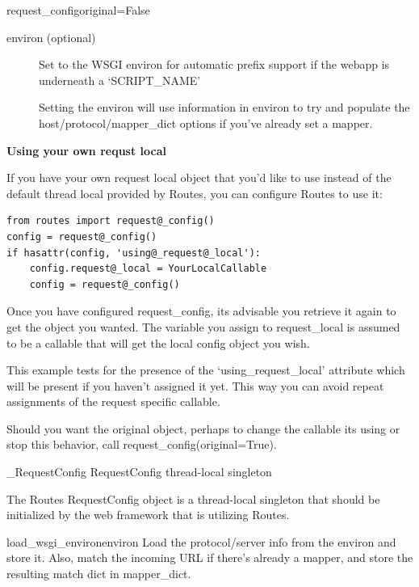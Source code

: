 \documentclass[letterpaper,10pt,english]{manual}
\begin{document}
\begin{funcdesc}{request\_config}{original=False}
\begin{description}
\item[environ (optional)] \leavevmode
Set to the WSGI environ for automatic prefix support if the
webapp is underneath a `SCRIPT\_NAME'

Setting the environ will use information in environ to try and
populate the host/protocol/mapper\_dict options if you've already
set a mapper.

\end{description}

\textbf{Using your own requst local}

If you have your own request local object that you'd like to use instead 
of the default thread local provided by Routes, you can configure Routes 
to use it:

\begin{Verbatim}[commandchars=@\[\]]
from routes import request@_config()
config = request@_config()
if hasattr(config, 'using@_request@_local'):
    config.request@_local = YourLocalCallable
    config = request@_config()
\end{Verbatim}

Once you have configured request\_config, its advisable you retrieve it 
again to get the object you wanted. The variable you assign to 
request\_local is assumed to be a callable that will get the local config 
object you wish.

This example tests for the presence of the `using\_request\_local' attribute
which will be present if you haven't assigned it yet. This way you can 
avoid repeat assignments of the request specific callable.

Should you want the original object, perhaps to change the callable its 
using or stop this behavior, call request\_config(original=True).
\end{funcdesc}

\hypertarget{routes.\_RequestConfig}{}\begin{classdesc}{\_RequestConfig}{}
RequestConfig thread-local singleton

The Routes RequestConfig object is a thread-local singleton that should 
be initialized by the web framework that is utilizing Routes.

\hypertarget{routes.\_RequestConfig.load\_wsgi\_environ}{}\begin{methoddesc}{load\_wsgi\_environ}{environ}
Load the protocol/server info from the environ and store it.
Also, match the incoming URL if there's already a mapper, and
store the resulting match dict in mapper\_dict.
\end{methoddesc}
\end{classdesc}
\end{document}
